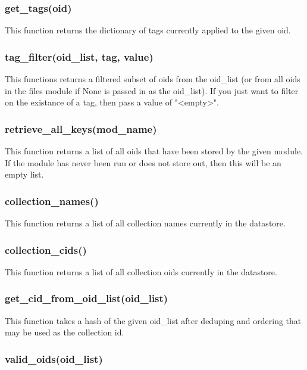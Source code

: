 \documentclass{book}
\begin{document}
\subsubsection{get\_tags(oid)}

This function returns the dictionary of tags currently applied to the given oid.

\subsubsection{tag\_filter(oid\_list, tag, value)}

This functions returns a filtered subset of oids from the oid\_list (or from all oids in the files module if None is passed in as the oid\_list).  If you just want to filter on the existance of a tag, then pass a value of "<empty>".

\subsubsection{retrieve\_all\_keys(mod\_name)}

This function returns a list of all oids that have been stored by the given module.  If the module has never been run or does not store out, then this will be an empty list.

\subsubsection{collection\_names()}

This function returns a list of all collection names currently in the datastore.

\subsubsection{collection\_cids()}

This function returns a list of all collection oids currently in the datastore.

\subsubsection{get\_cid\_from\_oid\_list(oid\_list)}

This function takes a hash of the given oid\_list after deduping and ordering that may be used as the collection id.

\subsubsection{valid\_oids(oid\_list)}
\end{document}
